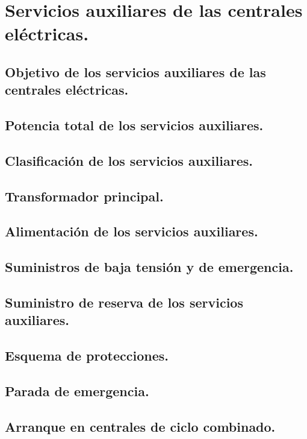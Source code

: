 \chapter{Servicios auxiliares de las centrales eléctricas.}
\section{Objetivo de los servicios auxiliares de las centrales eléctricas.}
\section{Potencia total de los servicios auxiliares.}
\section{Clasificación de los servicios auxiliares.}
\section{Transformador principal.}
\section{Alimentación de los servicios auxiliares.}
\section{Suministros de baja tensión y de emergencia.}
\section{Suministro de reserva de los servicios auxiliares.}
\section{Esquema de protecciones.}
\section{Parada de emergencia.}
\section{Arranque en centrales de ciclo combinado.}